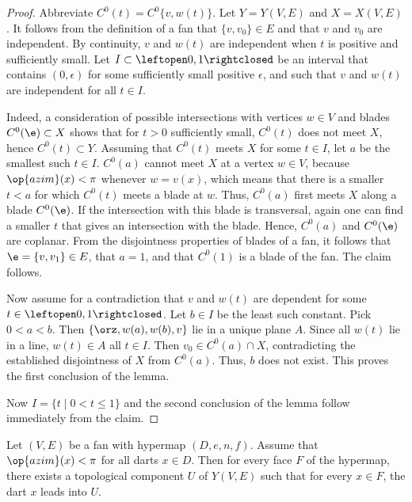 \begin{proof}
Abbreviate $C^0(t) = C^0\{v,w(t)\}$.
Let $Y = Y(V,E)$ and $X = X(V,E)$.
It follows from the definition of a fan that $\{v,v_0\}\in E$ and
that $v$ and $v_0$ are independent.  By continuity, $v$ and $w(t)$
are independent when $t$ is positive and sufficiently small.  
Let $I\subset\leftopen0,1\rightclosed$ be an interval that contains $(0,\epsilon)$ for some sufficiently small positive $\epsilon$, and such that $v$ and $w(t)$ are independent for all $t\in I$.

Indeed,  a consideration of possible intersections with vertices $w\in V$ and blades
$C^0(\e)\subset X$ shows that for $t>0$ sufficiently small,
$C^0(t)$ does not meet $X$, hence $C^0(t)\subset Y$.  Assuming 
that $C^0(t)$ meets $X$ for some $t\in I$, let $a$
be the smallest such $t\in I$.
$C^0(a)$ cannot meet $X$ at a vertex $w\in V$, because $\op{azim}(x)<\pi$ whenever $w=v(x)$, 
which means that 
there is a smaller $t<a$ for which $C^0(t)$ meets a blade at $w$.
Thus, $C^0(a)$ first meets $X$ along a blade $C^0(\e)$. If
the intersection with this blade is transversal, again one can find a smaller $t$ that
gives an intersection with the blade.  Hence, 
$C^0(a)$ and $C^0(\e)$ are coplanar.  From the disjointness
properties of blades of a fan, it follows that $\e = \{v,v_1\}\in E$,
that $a=1$, and that $C^0(1)$ is a blade of the fan.  The claim follows.

Now assume for a contradiction that $v$ and $w(t)$ are dependent for some $t\in\leftopen0,1\rightclosed$.  Let $b\in I$ be the least such constant.  
Pick $0<a<b$.  Then
$\{\orz,w(a),w(b),v\}$ lie in a unique plane $A$.  Since all $w(t)$
lie in a line,  $w(t)\in A$ all $t\in I$.  Then $v_0\in C^0(a)\cap X$,
contradicting the established disjointness of $X$ from $C^0(a)$.  Thus, $b$ does not exist.  This proves the first conclusion of the lemma.  

Now $I= \{t\mid 0 < t \le 1\}$ and the second conclusion of the lemma follow immediately from the claim.
\end{proof}

\begin{lemma} \label{lemma:UF}
Let $(V,E)$ be a fan with hypermap $(D,e,n,f)$.   Assume that $\op{azim}(x)<\pi$ for all darts $x\in D$. Then for every face $F$ of the hypermap, there exists a topological component $U$ of $Y(V,E)$ such that for every $x\in F$, the dart $x$ leads into $U$. 
\end{lemma}
%
%
%

